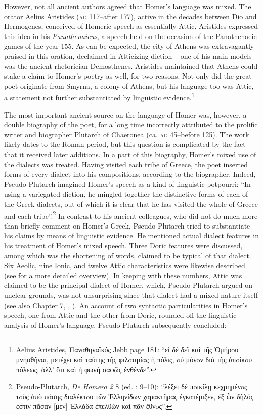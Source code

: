 However, not all ancient authors agreed that Homer’s language was mixed. The orator Aelius Aristides (\textsc{ad} 117–after 177), active in the decades between Dio and Hermogenes, conceived of Homeric speech as essentially Attic. Aristides expressed this idea in his \textit{Panathenaicus}, a speech held on the occasion of the Panathenaeic games of the year 155. As can be expected, the city of Athens was extravagantly praised in this oration, declaimed in Atticizing diction – one of his main models was the ancient rhetorician Demosthenes. Aristides maintained that Athens could stake a claim to Homer’s poetry as well, for two reasons. Not only did the great poet originate from Smyrna, a colony of Athens, but his language too was Attic, a statement not further substantiated by linguistic evidence.\footnote{Aelius Aristides, Παναθηναϊκός Jebb page 181: “εἰ δὲ δεῖ καὶ τῆς Ὁμήρoυ μνησθῆναι, μετέχει καὶ ταύτης τῆς φιλoτιμίας ἡ πόλις, oὐ μόνoν διὰ τῆς ἀπoίκoυ πόλεως, ἀλλ’ ὅτι καὶ ἡ φωνὴ σαφῶς ἐνθένδε”.}

The most important ancient source on the language of Homer was, however, a double biography of the poet, for a long time incorrectly attributed to the prolific writer and biographer Plutarch of Chaeronea (ca. \textsc{ad} 45–before 125). The work likely dates to the Roman period, but this question is complicated by the fact that it received later additions. In a part of this biography, Homer’s mixed use of the dialects was treated. Having visited each tribe of Greece, the poet inserted forms of every dialect into his compositions, according to the biographer. Indeed, Pseudo-Plutarch imagined Homer’s speech as a kind of linguistic potpourri: “In using a variegated diction, he mingled together the distinctive forms of each of the Greek dialects, out of which it is clear that he has visited the whole of Greece and each tribe”.\footnote{Pseudo-Plutarch, \textit{De Homero 2} 8 (ed. \citealt{Kindstrand1990}: 9–10): “λέξει δὲ πoικίλῃ κεχρημένoς τoὺς ἀπὸ πάσης διαλέκτoυ τῶν Ἑλληνίδων χαρακτῆρας ἐγκατέμιξεν, ἐξ ὧν δῆλός ἐστιν πᾶσαν [μὲν] Ἑλλάδα ἐπελθὼν καὶ πᾶν ἔθνoς”.} In contrast to his ancient colleagues, who did not do much more than briefly comment on Homer’s Greek, Pseudo-Plutarch tried to substantiate his claims by means of linguistic evidence. He mentioned actual dialect features in his treatment of Homer’s mixed speech. Three Doric features were discussed, among which was the shortening of words, claimed to be typical of that dialect. Six Aeolic, nine Ionic, and twelve Attic characteristics were likewise described (see \citealt{VanRooy2018c} for a more detailed overview). In keeping with these numbers, Attic was claimed to be the principal dialect of Homer, which, Pseudo-Plutarch argued on unclear grounds, was not unsurprising since that dialect had a mixed nature itself (see also Chapter 7, , ). An account of two syntactic particularities in Homer’s speech, one from Attic and the other from Doric, rounded off the linguistic analysis of Homer’s language. Pseudo-Plutarch subsequently concluded:

